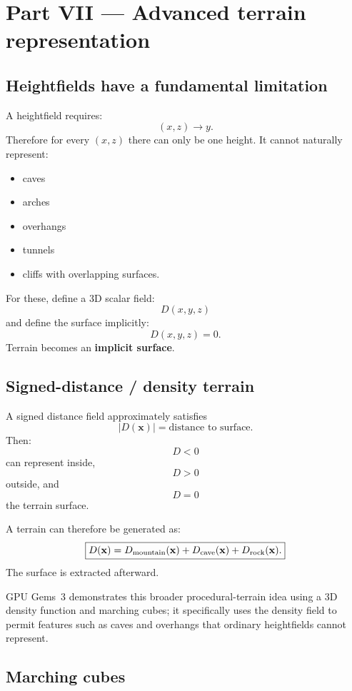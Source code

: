 \documentclass[12pt]{article}
\begin{document}
	\section*{Part VII — Advanced terrain representation}
	
	\subsection{Heightfields have a fundamental limitation}
	
	A heightfield requires:
	\[
	(x,z)\rightarrow y.
	\]
	Therefore for every $(x,z)$ there can only be one height.
	It cannot naturally represent:
	\begin{itemize}
		\item caves
		\item arches
		\item overhangs
		\item tunnels
		\item cliffs with overlapping surfaces.
	\end{itemize}
	
	For these, define a 3D scalar field:
	\[
	\boxed{
		D(x,y,z)
	}
	\]
	and define the surface implicitly:
	\[
	\boxed{
		D(x,y,z)=0.
	}
	\]
	Terrain becomes an \textbf{implicit surface}.
	
	\subsection{Signed-distance / density terrain}
	
	A signed distance field approximately satisfies
	\[
	|D(\mathbf x)| = \text{distance to surface}.
	\]
	Then:
	\[
	D<0
	\]
	can represent inside,
	\[
	D>0
	\]
	outside,
	and
	\[
	D=0
	\]
	the terrain surface.
	
	A terrain can therefore be generated as:
	\[
	\boxed{
		D(\mathbf x)= D_{\rm mountain}(\mathbf x) + D_{\rm cave}(\mathbf x) + D_{\rm rock}(\mathbf x).
	}
	\]
	The surface is extracted afterward.
	
	GPU Gems~3 demonstrates this broader procedural-terrain idea using a 3D density function and marching cubes; it specifically uses the density field to permit features such as caves and overhangs that ordinary heightfields cannot represent.
	
	\subsection{Marching cubes}
	
\end{document}
